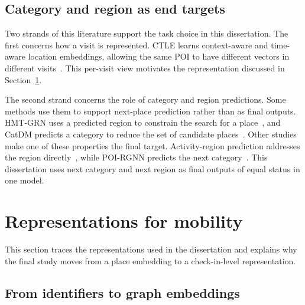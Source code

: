 \subsection{Category and region as end targets}

Two strands of this literature support the task choice in this dissertation. The first
concerns how a visit is represented. CTLE learns context-aware and time-aware location
embeddings, allowing the same POI to have different vectors in different
visits~\cite{lin2021ctle}. This per-visit view motivates the representation discussed in
Section~\ref{sec:fund:repr}.

The second strand concerns the role of category and region predictions. Some methods
use them to support next-place prediction rather than as final outputs. HMT-GRN uses a
predicted region to constrain the search for a place~\cite{Lim2022}, and CatDM predicts
a category to reduce the set of candidate places~\cite{yu2020catdm}. Other studies make
one of these properties the final target. Activity-region prediction addresses the
region directly~\cite{zhu2022drrgnn}, while POI-RGNN predicts the next
category~\cite{capanema2023poirgnn}. This dissertation uses next category and next
region as final outputs of equal status in one model.


\section{Representations for mobility}
\label{sec:fund:repr}

This section traces the representations used in the dissertation and explains why the
final study moves from a place embedding to a check-in-level representation.

\subsection{From identifiers to graph embeddings}

